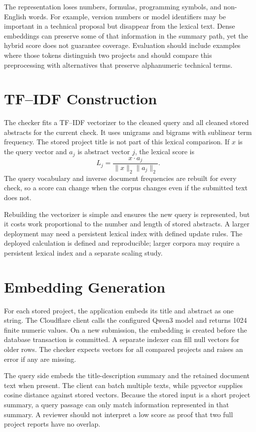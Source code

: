 \documentclass[12pt,a4paper]{report}
\begin{document}
The representation loses numbers, formulas, programming symbols, and non-English words. For example, version numbers or model identifiers may be important in a technical proposal but disappear from the lexical text. Dense embeddings can preserve some of that information in the summary path, yet the hybrid score does not guarantee coverage. Evaluation should include examples where those tokens distinguish two projects and should compare this preprocessing with alternatives that preserve alphanumeric technical terms.

\section{TF--IDF Construction}
The checker fits a TF--IDF vectorizer to the cleaned query and all cleaned stored abstracts for the current check. It uses unigrams and bigrams with sublinear term frequency. The stored project title is not part of this lexical comparison. If $x$ is the query vector and $a_j$ is abstract vector $j$, the lexical score is
\begin{equation}L_j=\frac{x\cdot a_j}{\|x\|_2\|a_j\|_2}.\end{equation}
The query vocabulary and inverse document frequencies are rebuilt for every check, so a score can change when the corpus changes even if the submitted text does not.

Rebuilding the vectorizer is simple and ensures the new query is represented, but it costs work proportional to the number and length of stored abstracts. A larger deployment may need a persistent lexical index with defined update rules. The deployed calculation is defined and reproducible; larger corpora may require a persistent lexical index and a separate scaling study.


\section{Embedding Generation}
For each stored project, the application embeds its title and abstract as one string. The Cloudflare client calls the configured Qwen3 model and returns 1024 finite numeric values. On a new submission, the embedding is created before the database transaction is committed. A separate indexer can fill null vectors for older rows. The checker expects vectors for all compared projects and raises an error if any are missing.

The query side embeds the title-description summary and the retained document text when present. The client can batch multiple texts, while pgvector supplies cosine distance against stored vectors. Because the stored input is a short project summary, a query passage can only match information represented in that summary. A reviewer should not interpret a low score as proof that two full project reports have no overlap.
\end{document}
